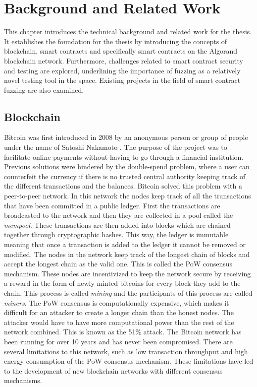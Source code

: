 
\chapter{Background and Related Work}\label{chapter:background}
This chapter introduces the technical background and related work for the thesis. It establishes the foundation for the thesis by introducing the concepts of blockchain, smart contracts and specifically smart contracts on the Algorand blockchain network. Furthermore, challenges related to smart contract security and testing are explored, underlining the importance of fuzzing as a relatively novel testing tool in the space. Existing projects in the field of smart contract fuzzing are also examined.

\section{Blockchain}
Bitcoin was first introduced in 2008 by an anonymous person or group of people under the name of Satoshi Nakamoto \cite{nakamoto_bitcoin_2008}. The purpose of the project was to facilitate online payments without having to go through a financial institution. Previous solutions were hindered by the double-spend problem, where a user can counterfeit the currency if there is no trusted central authority keeping track of the different transactions and the balances. Bitcoin solved this problem with a peer-to-peer network.
In this network the nodes keep track of all the transactions that have been committed in a public ledger.
First the transactions are broadcasted to the network and then they are collected in a pool called the \emph{mempool}.
These transactions are then added into blocks which are chained together through cryptographic hashes.
This way, the ledger is immutable meaning that once a transaction is added to the ledger it cannot be removed or modified.
The nodes in the network keep track of the longest chain of blocks and accept the longest chain as the valid one. This is called the \ac{PoW} consensus mechanism. These nodes are incentivized to keep the network secure by receiving a reward in the form of newly minted bitcoins for every block they add to the chain. This process is called \textit{mining} and the participants of this process are called \emph{miners}. The \ac{PoW} consensus is computationally expensive, which makes it difficult for an attacker to create a longer chain than the honest nodes. The attacker would have to have more computational power than the rest of the network combined.
This is known as the 51\% attack. The Bitcoin network has been running for over 10 years and has never been compromised.
There are several limitations to this network, such as low transaction throughput and high energy consumption of the \ac{PoW} consensus mechanism.
These limitations have led to the development of new blockchain networks with different consensus mechanisms.

